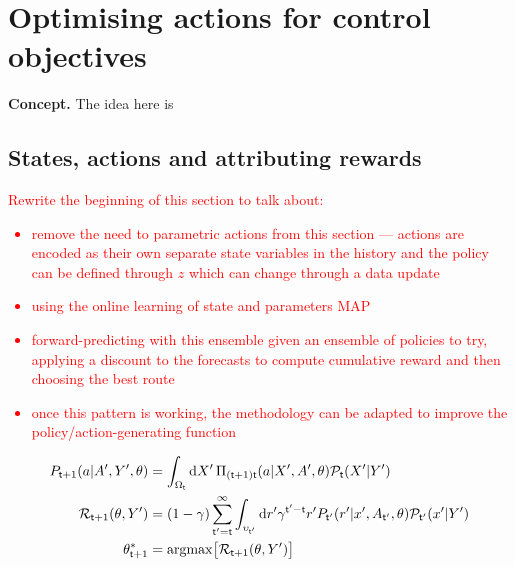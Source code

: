 \chapter{\sffamily Optimising actions for control objectives}

{\bfseries\sffamily Concept.} The idea here is 

\section{\sffamily States, actions and attributing rewards}

\textcolor{red}{Rewrite the beginning of this section to talk about:
\begin{itemize}
\item{remove the need to parametric actions from this section --- actions are encoded as their own separate state variables in the history and the policy can be defined through $z$ which can change through a data update}
\item{using the online learning of state and parameters MAP}
\item{forward-predicting with this ensemble given an ensemble of policies to try, applying a discount to the forecasts to compute cumulative reward and then choosing the best route}
\item{once this pattern is working, the methodology can be adapted to improve the policy/action-generating function}    
\end{itemize}
\begin{align}
P_{{\sf t}+1}(a\vert A', Y', \theta) &= \int_{\Omega_{{\sf t}}} {\rm d}X' \, \Pi_{({\sf t}+1){\sf t}}(a\vert X',A',\theta){\cal P}_{{\sf t}}(X'\vert Y') \\
{\cal R}_{{\sf t}+1}(\theta, Y') &=(1-\gamma)\sum_{{\sf t}'={\sf t}}^{\infty}\int_{\upsilon_{{\sf t}'}} {\rm d}r' \gamma^{{\sf t}'-{\sf t}}r'P_{{\sf t}'}(r'\vert x', A_{{\sf t}'},\theta ){\cal P}_{{\sf t}'}(x'\vert Y') \\
\theta^*_{{\sf t}+1} &= {\rm argmax} \big[ {\cal R}_{{\sf t}+1}(\theta, Y')\big]
\end{align}
}

